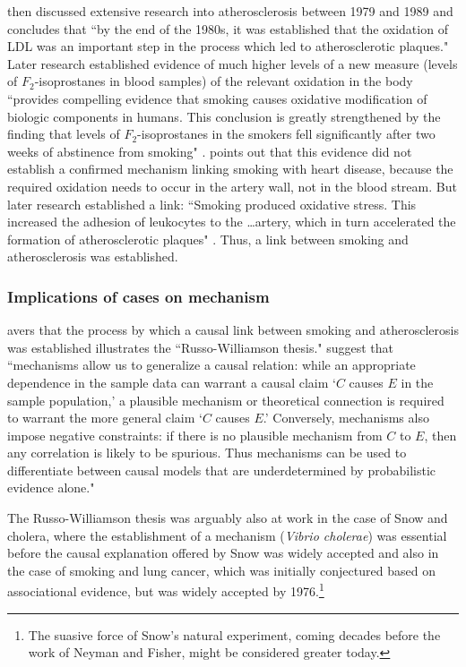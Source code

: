 \documentclass[11pt]{amsart}
\begin{document}
 \citet{Gillies2011-GILTRT-3} then discussed extensive research into atherosclerosis between 1979 and 1989 and concludes that ``by the end of the 1980s, it was established that the oxidation of LDL was an important step in the process which led to atherosclerotic plaques."  Later research established evidence of much higher levels of a new measure (levels of $F_2$-isoprostanes in blood samples) of the relevant oxidation in the body ``provides compelling evidence that smoking causes oxidative modification of biologic components in humans. This conclusion is greatly strengthened by the finding that levels of $F_2$-isoprostanes in the smokers fell significantly after two weeks of abstinence from smoking" \citep[pp.\,1201--2]{Morrow:1995gz}.  \citet[p.\,120]{Gillies2011-GILTRT-3} points out that this evidence did not establish a confirmed mechanism linking smoking with heart disease, because the required oxidation needs to occur in the artery wall, not in the blood stream. But later research established a link: ``Smoking produced oxidative stress. This increased the adhesion of leukocytes to the \dots artery, which in turn accelerated the formation of atherosclerotic plaques" \citep[p.\,123]{Gillies2011-GILTRT-3}.
Thus, a link between smoking and atherosclerosis was established.


\subsubsection{Implications of cases on mechanism}
 \citet{Gillies2011-GILTRT-3} avers that the process by which a causal link between smoking and atherosclerosis was established illustrates the ``Russo-Williamson thesis."
 \citet[p.\,159]{Russo:2007iz} suggest that ``mechanisms allow us to generalize a causal relation: while an appropriate dependence in the sample data can warrant a causal claim `$C$ causes $E$ in the sample population,' a plausible mechanism or theoretical connection is required to warrant the more general claim `$C$ causes $E$.' Conversely, mechanisms also impose negative constraints: if there is no plausible mechanism from $C$ to $E$, then any correlation is likely to be spurious. Thus mechanisms can be used to differentiate between causal models that are underdetermined by probabilistic evidence alone."

 The Russo-Williamson thesis was arguably also at work in the case of Snow and cholera, where the establishment of a mechanism (\emph{Vibrio cholerae}) was essential before the causal explanation offered by Snow was widely accepted and also in the case of smoking and lung cancer, which was initially conjectured based on associational evidence, but was widely accepted by 1976.\footnote{
 The suasive force of Snow's natural experiment, coming decades before the work of Neyman and Fisher, might be considered greater today.}
\end{document}
